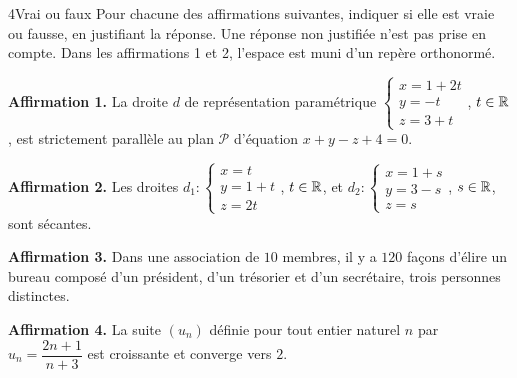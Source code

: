 \begin{exoBac}{4}{Vrai ou faux}
Pour chacune des affirmations suivantes, indiquer si elle est vraie ou fausse, en justifiant la réponse. Une réponse non justifiée
n'est pas prise en compte. Dans les affirmations 1 et 2, l'espace est muni d'un repère orthonormé.
\begin{questions}
  \item \textbf{Affirmation 1.} La droite $d$ de représentation paramétrique $\begin{cases}x=1+2t\\y=-t\\z=3+t\end{cases}$, $t\in\mathbb{R}$, est
    strictement parallèle au plan $\mathcal{P}$ d'équation $x+y-z+4=0$.
  \item \textbf{Affirmation 2.} Les droites $d_1:\begin{cases}x=t\\y=1+t\\z=2t\end{cases}$, $t\in\mathbb{R}$, et
    $d_2:\begin{cases}x=1+s\\y=3-s\\z=s\end{cases}$, $s\in\mathbb{R}$, sont sécantes.
  \item \textbf{Affirmation 3.} Dans une association de $10$ membres, il y a $120$ façons d'élire un bureau composé d'un président,
    d'un trésorier et d'un secrétaire, trois personnes distinctes.
  \item \textbf{Affirmation 4.} La suite $(u_n)$ définie pour tout entier naturel $n$ par $u_n=\dfrac{2n+1}{n+3}$ est croissante et
    converge vers $2$.
\end{questions}
\end{exoBac}

